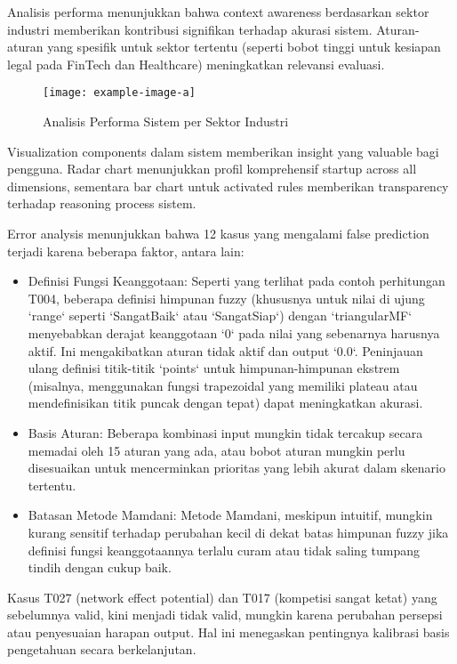 \documentclass[12pt,a4paper]{article}
\begin{document}
Analisis performa menunjukkan bahwa context awareness berdasarkan sektor industri memberikan kontribusi signifikan terhadap akurasi sistem. Aturan-aturan yang spesifik untuk sektor tertentu (seperti bobot tinggi untuk kesiapan legal pada FinTech dan Healthcare) meningkatkan relevansi evaluasi.

\begin{figure}[htbp] %
    \centering
    \texttt{[image: example-image-a]} %
    \caption{Analisis Performa Sistem per Sektor Industri}
    \label{fig:sector-analysis}
\end{figure}

Visualization components dalam sistem memberikan insight yang valuable bagi pengguna. Radar chart menunjukkan profil komprehensif startup across all dimensions, sementara bar chart untuk activated rules memberikan transparency terhadap reasoning process sistem.

Error analysis menunjukkan bahwa 12 kasus yang mengalami false prediction terjadi karena beberapa faktor, antara lain:
\begin{itemize}
    \item Definisi Fungsi Keanggotaan: Seperti yang terlihat pada contoh perhitungan T004, beberapa definisi himpunan fuzzy (khususnya untuk nilai di ujung `range` seperti `SangatBaik` atau `SangatSiap`) dengan `triangularMF` menyebabkan derajat keanggotaan `0` pada nilai yang sebenarnya harusnya aktif. Ini mengakibatkan aturan tidak aktif dan output `0.0`. Peninjauan ulang definisi titik-titik `points` untuk himpunan-himpunan ekstrem (misalnya, menggunakan fungsi trapezoidal yang memiliki plateau atau mendefinisikan titik puncak dengan tepat) dapat meningkatkan akurasi.
    \item Basis Aturan: Beberapa kombinasi input mungkin tidak tercakup secara memadai oleh 15 aturan yang ada, atau bobot aturan mungkin perlu disesuaikan untuk mencerminkan prioritas yang lebih akurat dalam skenario tertentu.
    \item Batasan Metode Mamdani: Metode Mamdani, meskipun intuitif, mungkin kurang sensitif terhadap perubahan kecil di dekat batas himpunan fuzzy jika definisi fungsi keanggotaannya terlalu curam atau tidak saling tumpang tindih dengan cukup baik.
\end{itemize}
Kasus T027 (network effect potential) dan T017 (kompetisi sangat ketat) yang sebelumnya valid, kini menjadi tidak valid, mungkin karena perubahan persepsi atau penyesuaian harapan output. Hal ini menegaskan pentingnya kalibrasi basis pengetahuan secara berkelanjutan.
\end{document}
